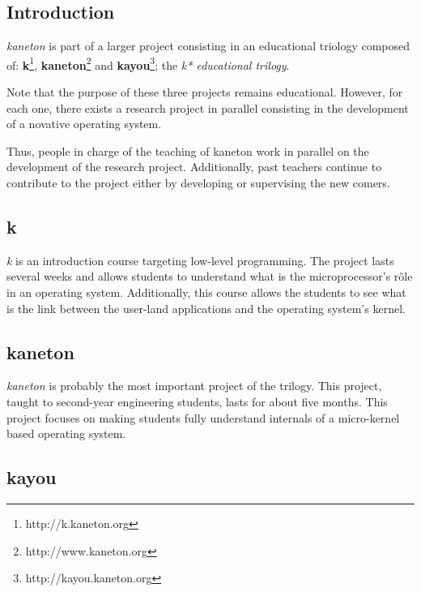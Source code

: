 \begin{multicols}{2}

%
%

\section{Introduction}

\textit{kaneton} is part of a larger project consisting in an educational
triology composed of:
  \textbf{k}\footnote{http://k.kaneton.org},
  \textbf{kaneton}\footnote{http://www.kaneton.org} and
  \textbf{kayou}\footnote{http://kayou.kaneton.org}; the
\textit{k* educational trilogy}.

Note that the purpose of these three projects remains educational. However,
for each one, there exists a research project in parallel consisting in the
development of a novative operating system.

Thus, people in charge of the teaching of kaneton work in parallel on the
development of the research project. Additionally, past teachers continue
to contribute to the project either by developing or supervising the
new comers.

%
%

\subsection{k}

\textit{k} is an introduction course targeting low-level programming. The
project lasts several weeks and allows students to understand what is the
microprocessor's r\^ole in an operating system. Additionally, this course
allows the students to see what is the link between the user-land applications
and the operating system's kernel.

%
%

\subsection{kaneton}

\textit{kaneton} is probably the most important project of the trilogy. This
project, taught to second-year engineering students, lasts for about five
months. This project focuses on making students fully understand
internals of a micro-kernel based operating system.

%
%

\subsection{kayou}


\end{multicols}
